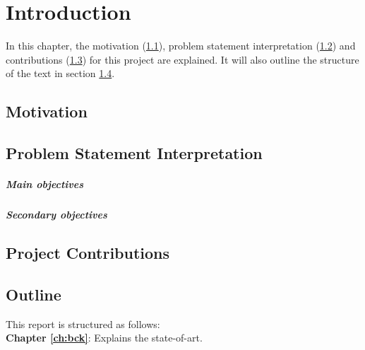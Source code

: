 \chapter{Introduction}
In this chapter, the motivation (\ref{sec:mot}), problem statement interpretation (\ref{sec:rq}) and contributions (\ref{sec:cont}) for this project are explained. It will also outline the structure of the text in section \ref{sec:out}. 

\section{Motivation}
\label{sec:mot}

\section{Problem Statement Interpretation}
\label{sec:rq}


\paragraph*{Main objectives} \hfill


\paragraph*{Secondary objectives} \hfill



\section{Project Contributions}
\label{sec:cont}


\section{Outline}
\label{sec:out}
This report is structured as follows:\\

\noindent
\textbf{Chapter \ref{ch:bck}}: Explains the state-of-art.
